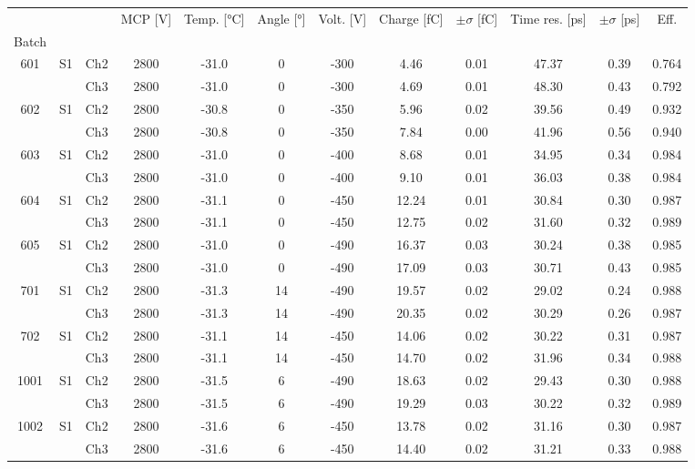 \begin{tabular}{cccccccccccc}
\toprule
 &  &  & MCP [V] & Temp. [°C] & Angle [°] & Volt. [V] & Charge [fC] & \(\pm\sigma\) [fC] & Time res. [ps] & \(\pm\sigma\) [ps] & Eff. \\
Batch &  &  &  &  &  &  &  &  &  &  &  \\
\midrule
601 & S1 & Ch2 & 2800 & -31.0 & 0 & -300 & 4.46 & 0.01 & 47.37 & 0.39 & 0.764 \\
 &  & Ch3 & 2800 & -31.0 & 0 & -300 & 4.69 & 0.01 & 48.30 & 0.43 & 0.792 \\
602 & S1 & Ch2 & 2800 & -30.8 & 0 & -350 & 5.96 & 0.02 & 39.56 & 0.49 & 0.932 \\
 &  & Ch3 & 2800 & -30.8 & 0 & -350 & 7.84 & 0.00 & 41.96 & 0.56 & 0.940 \\
603 & S1 & Ch2 & 2800 & -31.0 & 0 & -400 & 8.68 & 0.01 & 34.95 & 0.34 & 0.984 \\
 &  & Ch3 & 2800 & -31.0 & 0 & -400 & 9.10 & 0.01 & 36.03 & 0.38 & 0.984 \\
604 & S1 & Ch2 & 2800 & -31.1 & 0 & -450 & 12.24 & 0.01 & 30.84 & 0.30 & 0.987 \\
 &  & Ch3 & 2800 & -31.1 & 0 & -450 & 12.75 & 0.02 & 31.60 & 0.32 & 0.989 \\
605 & S1 & Ch2 & 2800 & -31.0 & 0 & -490 & 16.37 & 0.03 & 30.24 & 0.38 & 0.985 \\
 &  & Ch3 & 2800 & -31.0 & 0 & -490 & 17.09 & 0.03 & 30.71 & 0.43 & 0.985 \\
701 & S1 & Ch2 & 2800 & -31.3 & 14 & -490 & 19.57 & 0.02 & 29.02 & 0.24 & 0.988 \\
 &  & Ch3 & 2800 & -31.3 & 14 & -490 & 20.35 & 0.02 & 30.29 & 0.26 & 0.987 \\
702 & S1 & Ch2 & 2800 & -31.1 & 14 & -450 & 14.06 & 0.02 & 30.22 & 0.31 & 0.987 \\
 &  & Ch3 & 2800 & -31.1 & 14 & -450 & 14.70 & 0.02 & 31.96 & 0.34 & 0.988 \\
1001 & S1 & Ch2 & 2800 & -31.5 & 6 & -490 & 18.63 & 0.02 & 29.43 & 0.30 & 0.988 \\
 &  & Ch3 & 2800 & -31.5 & 6 & -490 & 19.29 & 0.03 & 30.22 & 0.32 & 0.989 \\
1002 & S1 & Ch2 & 2800 & -31.6 & 6 & -450 & 13.78 & 0.02 & 31.16 & 0.30 & 0.987 \\
 &  & Ch3 & 2800 & -31.6 & 6 & -450 & 14.40 & 0.02 & 31.21 & 0.33 & 0.988 \\
\bottomrule
\end{tabular}
